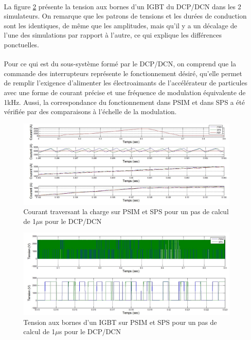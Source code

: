\paragraph{} La figure \ref{DC_IG_ten_1} présente la tension aux bornes d'un IGBT du DCP/DCN dans les 2 simulateurs. On remarque que les patrons de tensions et les durées de conduction sont les identiques, de même que les amplitudes, mais qu'il y a un décalage de l'une des simulations par rapport à l'autre, ce qui explique les différences ponctuelles. 

\paragraph{}Pour ce qui est du sous-système formé par le DCP/DCN, on comprend que la commande des interrupteurs représente le fonctionnement désiré, qu'elle permet de remplir l'exigence d'alimenter les électroaimants de l'accélérateur de particules avec une forme de courant précise et une fréquence de modulation équivalente de 1kHz. Aussi, la correspondance du fonctionnement dans PSIM et dans SPS a été vérifiée par des comparaisons à l'échelle de la modulation. 

\begin{figure}[htb]
\centering
\includegraphics[scale=0.5]{fig/DCPDCN/DCPCourantCharge1u.jpg}
\caption{Courant traversant la charge sur PSIM et SPS pour un pas de calcul de 1$\mu$s pour le DCP/DCN}
\label{DC_ch_cou_1}
\end{figure}

\begin{figure}[htb]
\centering
\includegraphics[scale=0.5]{fig/DCPDCN/DCPTensionIGBT1u.jpg}
\caption{Tension aux bornes d'un IGBT sur PSIM et SPS pour un pas de calcul de 1$\mu$s pour le DCP/DCN}
\label{DC_IG_ten_1}
\end{figure}

